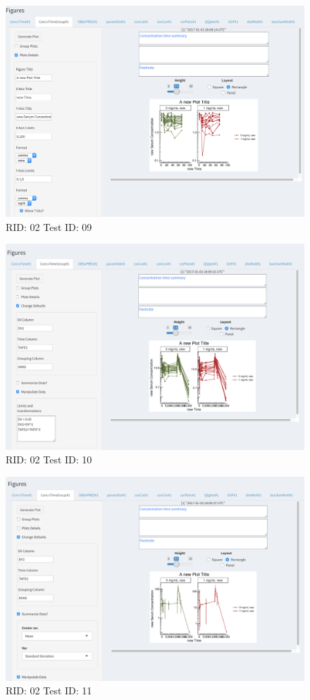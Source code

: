 \begin{figure}[H]
\includegraphics[width=.8\textwidth]{screencaps/02-09-1.png}
\caption{RID: 02 Test ID: 09}
\end{figure}
\begin{figure}[H]
\includegraphics[width=.8\textwidth]{screencaps/02-10-1.png}
\caption{RID: 02 Test ID: 10}
\end{figure}
\begin{figure}[H]
\includegraphics[width=.8\textwidth]{screencaps/02-11-1.png}
\caption{RID: 02 Test ID: 11}
\end{figure}
